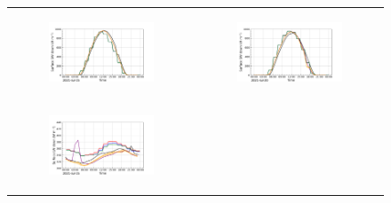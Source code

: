 \begin{figure}[hbtp]
    \centering
    \begin{tabular}{cc}
        \begin{subfigure}[t]{0.5\textwidth}
            \caption{}
            \includegraphics[width=\textwidth]{images/chap5/IOP_TS/TS_2021-07-15_cendrosa_SWdnSFC.png}
        \end{subfigure} &
        \begin{subfigure}[t]{0.5\textwidth}
            \caption{}
            \includegraphics[width=\textwidth]{images/chap5/IOP_TS/TS_2021-07-20_cendrosa_SWdnSFC.png}
        \end{subfigure} \\
        \begin{subfigure}[t]{0.5\textwidth}
            \caption{}
            \includegraphics[width=\textwidth]{images/chap5/IOP_TS/TS_2021-07-15_cendrosa_LWdnSFC.png}

\end{subfigure}
\end{tabular}
\end{figure}
